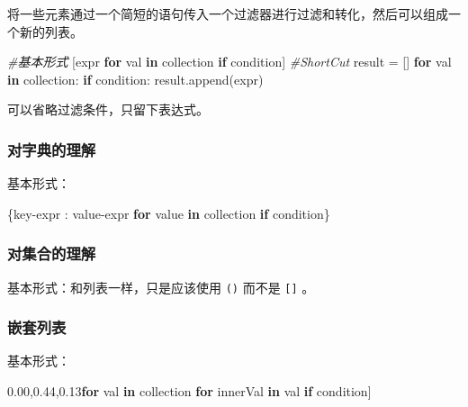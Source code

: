 \documentclass[]{article}
\newenvironment{Shaded}{}{}
\newcommand{\KeywordTok}[1]{\textcolor[rgb]{0.00,0.44,0.13}{\textbf{#1}}}
\newcommand{\CommentTok}[1]{\textcolor[rgb]{0.38,0.63,0.69}{\textit{#1}}}
\newcommand{\ControlFlowTok}[1]{\textcolor[rgb]{0.00,0.44,0.13}{\textbf{#1}}}
\newcommand{\OperatorTok}[1]{\textcolor[rgb]{0.40,0.40,0.40}{#1}}
\newcommand{\NormalTok}[1]{#1}
\begin{document}
将一些元素通过一个简短的语句传入一个过滤器进行过滤和转化，然后可以组成一个新的列表。

\begin{Shaded}
\begin{Highlighting}[]
\CommentTok{#基本形式}
\NormalTok{[expr }\ControlFlowTok{for}\NormalTok{ val }\KeywordTok{in}\NormalTok{ collection }\ControlFlowTok{if}\NormalTok{ condition]}
\CommentTok{#ShortCut}
\NormalTok{result }\OperatorTok{=}\NormalTok{ []}
\ControlFlowTok{for}\NormalTok{ val }\KeywordTok{in}\NormalTok{ collection:}
  \ControlFlowTok{if}\NormalTok{ condition:}
\NormalTok{    result.append(expr)}
\end{Highlighting}
\end{Shaded}

可以省略过滤条件，只留下表达式。

\subsubsection{对字典的理解}\label{header-n378}

基本形式：

\begin{Shaded}
\begin{Highlighting}[]
\NormalTok{\{key}\OperatorTok{-}\NormalTok{expr : value}\OperatorTok{-}\NormalTok{expr }\ControlFlowTok{for}\NormalTok{ value }\KeywordTok{in}\NormalTok{ collection }\ControlFlowTok{if}\NormalTok{ condition\}}
\end{Highlighting}
\end{Shaded}

\subsubsection{对集合的理解}\label{header-n382}

基本形式：和列表一样，只是应该使用 \texttt{()} 而不是 \texttt{{[}{]}} 。

\subsubsection{嵌套列表}\label{header-n385}

基本形式：

\begin{Shaded}
\begin{Highlighting}[]
\NormalTok{[expr }\ControlFlowTok{for}\NormalTok{ val }\KeywordTok{in}\NormalTok{ collection }\ControlFlowTok{for}\NormalTok{ innerVal }\KeywordTok{in}\NormalTok{ val }\ControlFlowTok{if}\NormalTok{ condition]}
\end{Highlighting}
\end{Shaded}
\end{document}
